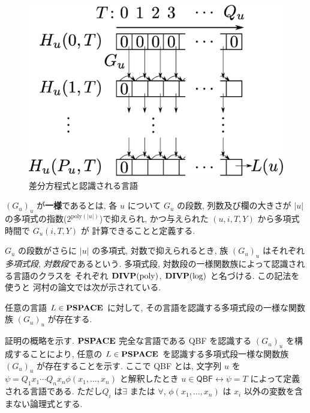  \begin{figure}
  \label{fig:divp}
  \begin{center}
   \includegraphics[height=0.2\textheight]{image/divp.eps}
  \end{center}
  \caption{差分方程式と認識される言語}
 \end{figure}

$(G_u)_u$ が{\bf 一様}であるとは,
各 $u$ について $G _u$ の段数, 列数及び欄の大きさが $|u|$ の多項式の指数($2^{\mathrm{poly} (|u|)}$)で抑えられ, 
かつ与えられた $(u, i, T, Y)$ から多項式時間で $G_u(i, T, Y)$ が
計算できることと定義する.

$G_u$ の段数がさらに $|u|$ の多項式, 対数で抑えられるとき, 
族 $(G_u) _u$ はそれぞれ\emph{多項式段}, \emph{対数段}であるという. 
多項式段, 対数段の一様関数族によって認識される言語のクラスを
それぞれ $\mathbf{DIVP(\mathrm{poly})}$, $\mathbf{DIVP(\log)}$ と名づける.
この記法を使うと
河村の論文では次が示されている.

 \begin{lemma}
  \label{WeakFeedback}
  任意の言語 $L \in \mathbf{PSPACE}$ に対して,
  その言語を認識する多項式段の一様な関数族 $(G_u)_u$ が存在する.
 \end{lemma}


証明の概略を示す.
$\mathbf{PSPACE}$ 完全な言語である
\textsf{QBF} を認識する $(G_u)_u$ を構成することにより,
任意の $L \in \mathbf{PSPACE}$ を認識する多項式段一様な関数族 $(G_u)_u$ が存在することを示す.
ここで \textsf{QBF} とは,
文字列 $u$ を $\psi = Q_1 x_1 \cdots Q_n x_n \phi(x_1, \dots, x_n)$ と解釈したとき 
$u \in \textsf{QBF} \leftrightarrow \psi = T$ によって定義される言語である. 
ただし$Q_i$ は$\exists$ または $\forall$,  
$\phi(x_1, \dots, x_n)$ は $x_i$ 以外の変数を含まない論理式とする. 

